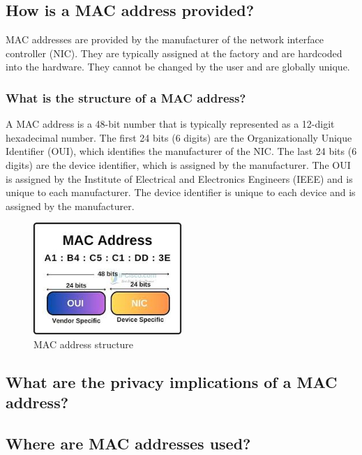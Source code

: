 \documentclass[aps,prb,twocolumn,superscriptaddress,floatfix,longbibliography,nofootinbib]{revtex4-2}
\begin{document}
  \subsection{\label{sec:Provided}How is a MAC address provided?}
  MAC addresses are provided by the manufacturer of the network interface controller (NIC).
  They are typically assigned at the factory and are hardcoded into the hardware.
  They cannot be changed by the user and are globally unique.
    \subsubsection{\label{sec:Structure}What is the structure of a MAC address?}
    A MAC address is a 48-bit number that is typically represented as a 12-digit hexadecimal number.
    The first 24 bits (6 digits) are the Organizationally Unique Identifier (OUI), 
    which identifies the manufacturer of the NIC.
    The last 24 bits (6 digits) are the device identifier, which is assigned by the manufacturer.
    The OUI is assigned by the Institute of Electrical and Electronics Engineers (IEEE)
    and is unique to each manufacturer.
    The device identifier is unique to each device and is assigned by the manufacturer.
  \begin{figure}[H]
      \centering
      \includegraphics[width=0.5\textwidth]{pictures/mac.jpeg}
      \caption{MAC address structure \cite{MAC}}
      \label{fig:MAC}
  \end{figure}

  \subsection{\label{sec:Privacy}What are the privacy implications of a MAC address?}
  \subsection{\label{sec:Where}Where are MAC addresses used?}
\end{document}
